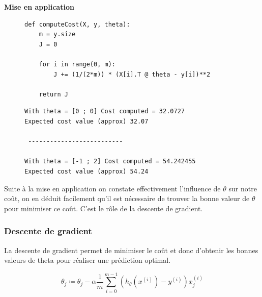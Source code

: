\vspace{.5cm}
\noindent
\textbf{Mise en application}
\vspace{.2cm}


\begin{figure}[!h]
    \begin{minipage}{.48\linewidth}
\begin{verbatim}
def computeCost(X, y, theta):  
    m = y.size
    J = 0

    for i in range(0, m):
        J += (1/(2*m)) * (X[i].T @ theta - y[i])**2

    return J
\end{verbatim}   
    \end{minipage}\hfill
    \begin{minipage}{.48\linewidth}
\begin{verbatim}
With theta = [0 ; 0] Cost computed = 32.0727 
Expected cost value (approx) 32.07

 -------------------------- 

With theta = [-1 ; 2] Cost computed = 54.242455
Expected cost value (approx) 54.24
\end{verbatim}   
    \end{minipage}
\end{figure}

Suite à la mise en application on constate effectivement l'influence de $\theta$ sur notre coût, on en déduit facilement qu'il est nécessaire de trouver la bonne valeur de $\theta$ pour minimiser ce coût. C'est le rôle de la descente de gradient.



\subsubsection{Descente de gradient}

La descente de gradient permet de minimiser le coût et donc d'obtenir les bonnes valeurs de theta pour réaliser une prédiction optimal.

\begin{equation}\label{eq:cout}
    \theta_j \coloneqq \theta_j - \alpha \frac{1}{m} \sum_{i=0}^{m-1} (h_\theta(x^{(i)}) - y^{(i)}) x_j^{(i)}
 \end{equation}

